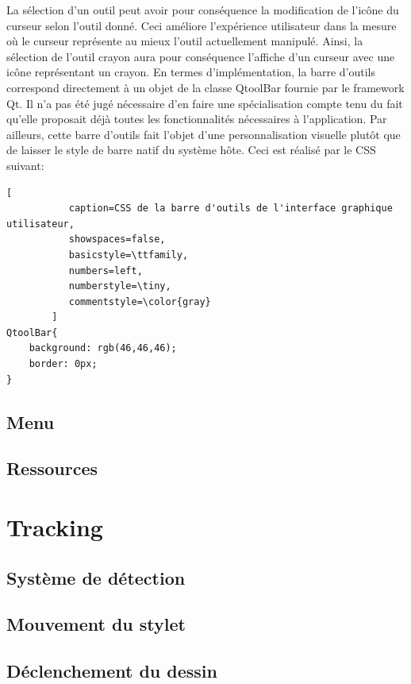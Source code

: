 \documentclass[11pt,a4paper,oldfontcommands]{memoir}
\begin{document}
La sélection d'un outil peut avoir pour conséquence la modification de l'icône du curseur selon l'outil donné. Ceci améliore l'expérience utilisateur dans la mesure où le curseur représente au mieux l'outil actuellement manipulé. Ainsi, la sélection de l'outil crayon aura pour conséquence l'affiche d'un curseur avec une icône représentant un crayon. En termes d'implémentation, la barre d'outils correspond directement à un objet de la classe QtoolBar fournie par le framework Qt. Il n'a pas été jugé nécessaire d'en faire une spécialisation compte tenu du fait qu'elle proposait déjà toutes les fonctionnalités nécessaires à l'application. Par ailleurs, cette barre d'outils fait l'objet d'une personnalisation visuelle plutôt que de laisser le style de barre natif du système hôte. Ceci est réalisé par le CSS suivant:

\begin{lstlisting}[
           caption=CSS de la barre d'outils de l'interface graphique utilisateur,
           showspaces=false,
           basicstyle=\ttfamily,
           numbers=left,
           numberstyle=\tiny,
           commentstyle=\color{gray}
        ]
QtoolBar{ 
    background: rgb(46,46,46); 
    border: 0px; 
}
\end{lstlisting}

\newpage

\subsection{Menu}

\subsection{Ressources}

\section{Tracking}

\subsection{Système de détection}

\subsection{Mouvement du stylet}

\subsection{Déclenchement du dessin}
\end{document}

